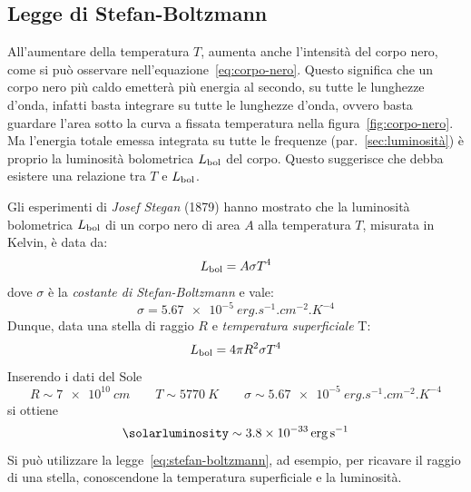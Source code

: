 \subsection{Legge di Stefan-Boltzmann}\label{sec:legge-stefan-boltzmann}
All'aumentare della temperatura $T$, aumenta anche l'intensità del corpo nero, come si può osservare nell'equazione~\eqref{eq:corpo-nero}. Questo significa che un corpo nero più caldo emetterà più energia al secondo, su tutte le lunghezze d'onda, infatti basta integrare su tutte le lunghezze d'onda, ovvero basta guardare l'area sotto la curva a fissata temperatura nella figura~\ref{fig:corpo-nero}. Ma l'energia totale emessa integrata su tutte le frequenze (par.~\ref{sec:luminosità}) è proprio la luminosità bolometrica $L_\textup{bol}$ del corpo. Questo suggerisce che debba esistere una relazione tra $T$ e $L_\textup{bol}$.

Gli esperimenti di \emph{Josef Stegan} (1879) hanno mostrato che la luminosità bolometrica $L_\textup{bol}$ di un corpo nero di area $A$ alla temperatura $T$, misurata in Kelvin, è data da:
\[
    L_\textup{bol} = A \sigma T^4
\]
dove $\sigma$ è la \emph{costante di Stefan-Boltzmann} e vale:
\[
    \sigma = \SI{5.67e-5}{erg.s^{-1}.cm^{-2}.K^{-4}}
\]
Dunque, data una stella di raggio $R$ e \emph{temperatura superficiale} T:
\begin{equation}\label{eq:stefan-boltzmann}
    L_\textup{bol} = 4 \pi R^2 \sigma T^4
\end{equation}
Inserendo i dati del Sole
\[
    R \sim \SI{7e10}{cm} \qquad T \sim \SI{5770}{K} \qquad \sigma \sim \SI{5.67e-5}{erg.s^{-1}.cm^{-2}.K^{-4}}
\]
si ottiene
\[
    \si{\solarluminosity} \sim \SI{3.8e-33}{erg.s^{-1}}
\]
Si può utilizzare la legge~\eqref{eq:stefan-boltzmann}, ad esempio, per ricavare il raggio di una stella, conoscendone la temperatura superficiale e la luminosità.